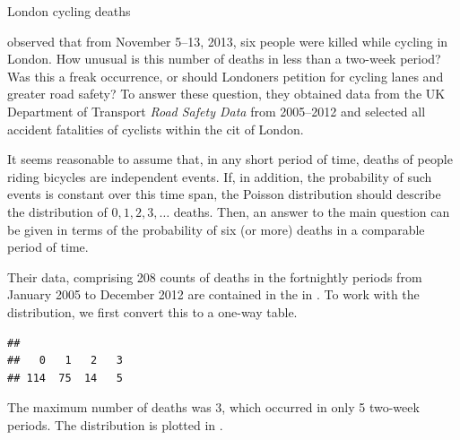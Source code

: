 \documentclass[11pt]{book}
\renewenvironment{knitrout}{\small\renewcommand{\baselinestretch}{.85}}{} %
\begin{document}
\begin{Example}[cyclists1]{London cycling deaths}

\citet{AberdeinSpiegelhalter:2013} observed that from November 5--13, 2013,
six people were killed while cycling in London.  How unusual is this
number of deaths in less than a two-week period?
Was this a freak occurrence, or should Londoners petition for
cycling lanes and greater road safety?
To answer these question, they obtained data from the 
UK Department of Transport \emph{Road Safety Data} from 2005--2012
and selected all accident fatalities of cyclists within the
cit of London.

It seems reasonable to assume that, in any short period of time, deaths of
people riding bicycles are independent events.  If, in addition, 
the probability of such events is constant over this time span,
the Poisson distribution should describe the distribution of
$0, 1, 2, 3, \dots$ deaths. Then, an answer to the main question can be
given in terms of the probability of six (or more) deaths in
a comparable period of time.

Their data, comprising 208 counts of deaths in the fortnightly periods
from January 2005 to December 2012 are contained in the \Dset
{} in .  To work with the
distribution, we first convert this to a one-way table.

\begin{knitrout}
\color{fgcolor}\begin{kframe}
\begin{alltt}
\hlstd{(}\hlstd{,} \hlstd{=}\hlstd{)}
 \hlkwb{<-} \hlopt{$}
\end{alltt}
\begin{verbatim}
## 
##   0   1   2   3 
## 114  75  14   5
\end{verbatim}
\end{kframe}
\end{knitrout}
The maximum number of deaths was 3, which occurred in only 5 two-week periods.
The distribution is plotted in .
\begin{knitrout}
\color{fgcolor}\begin{kframe}
\begin{alltt}
        \hlstd{=}\hlstd{,} \hlstd{=}\hlstd{,}
        \hlstd{=}\hlstd{,} \hlstd{=}\hlstd{)}
\end{alltt}
\end{kframe}\begin{figure}[!htbp]



\end{figure}
\end{knitrout}
\end{Example}
\end{document}
